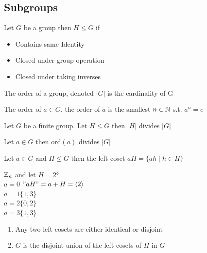 \subsection{Subgroups}

\begin{definition}
    Let $G$ be a group then $H \leq G$ if 
    \begin{itemize}
        \item Contains same Identity
        \item Closed under group operation
        \item Closed under taking inverses
    \end{itemize}
\end{definition}

\begin{definition}
    The order of a group, denoted $|G|$ is the cardinality of G
\end{definition}

\begin{definition}
    The order of $a \in G$, the order of $a$ is the
    smallest $n\in\mathbb{N}$ s.t. $a^n=e$
\end{definition}

\begin{theorem}
    Let $G$ be a finite group. Let $H \leq G$
    then $|H|$ divides $|G|$
\end{theorem}

\begin{corollary}
    Let  $a\in G$ then ord$(a)$ divides $|G|$
\end{corollary}

\begin{definition}
    Let $a\in G$ and $H \leq G$ then the left coset $aH=\{ah \mid h\in H\}$
\end{definition}

\begin{example}
    $\mathbb{Z}_n$ and let $H=\ang{2}$\\
    $a=0$ $"aH"=a+H=\left\langle 2 \right\rangle$\\
    $a=1 \{1,3\}$\\
    $a=2 \{0,2\}$\\
    $a=3 \{1,3\}$
\end{example}

\begin{proposition}
    \phantom{text}

    \begin{enumerate}
        \item Any two left cosets are either identical or disjoint
        \item $G$ is the disjoint union of the left cosets of $H$ in $G$
    \end{enumerate}
\end{proposition}
